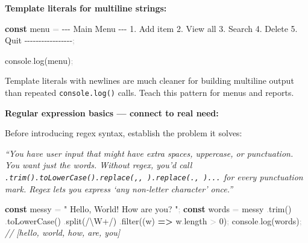 \documentclass[
  justified,
  openright,
]{tufte-book}
\newcommand{\KeywordTok}[1]{\textcolor{CodeKeyword}{\textbf{#1}}}  %
\newcommand{\StringTok}[1]{\textcolor{CodeString}{#1}}              %
\newcommand{\CommentTok}[1]{\textcolor{CodeComment}{\textit{#1}}}  %
\newcommand{\CodeNumTok}[1]{\textcolor{CodeNumber}{#1}}             %
\newcommand{\CodeFuncTok}[1]{\textcolor{CodeKeyword}{#1}}           %
\newcommand{\CodeTypeTok}[1]{\textcolor{CodeType}{#1}}              %
\newcommand{\OperatorTok}[1]{\textcolor{DarkGray}{#1}}              %
\newenvironment{Shaded}{%
  \begin{mdframed}[style=TufteCode]%
}{%
  \end{mdframed}%
}
\begin{document}
\textbf{Template literals for multiline strings:}

\begin{Shaded}
\begin{Highlighting}[]
\KeywordTok{const} menu \OperatorTok{=} \StringTok{\textasciigrave{}}
\StringTok{{-}{-}{-} Main Menu {-}{-}{-}}
\StringTok{1. Add item}
\StringTok{2. View all}
\StringTok{3. Search}
\StringTok{4. Delete}
\StringTok{5. Quit}
\StringTok{{-}{-}{-}{-}{-}{-}{-}{-}{-}{-}{-}{-}{-}{-}{-}{-}{-}\textasciigrave{}}\OperatorTok{;}
 
console\OperatorTok{.}\CodeFuncTok{log}(menu)\OperatorTok{;}
\end{Highlighting}
\end{Shaded}

Template literals with newlines are much cleaner for building multiline
output than repeated \texttt{console.log()} calls. Teach this pattern
for menus and reports.

\textbf{Regular expression basics --- connect to real need:}

Before introducing regex syntax, establish the problem it solves:

\emph{``You have user input that might have extra spaces, uppercase, or
punctuation. You want just the words. Without regex, you'd call
\texttt{.trim().toLowerCase().replace(\textquotesingle{},\textquotesingle{},\ \textquotesingle{}\textquotesingle{}).replace(\textquotesingle{}.\textquotesingle{},\ \textquotesingle{}\textquotesingle{})...}
for every punctuation mark. Regex lets you express `any non-letter
character' once.''}

\begin{Shaded}
\begin{Highlighting}[]
\KeywordTok{const} messy \OperatorTok{=} \StringTok{"  Hello, World!   How are you?  "}\OperatorTok{;}
\KeywordTok{const} words \OperatorTok{=} messy
  \OperatorTok{.}\CodeFuncTok{trim}()
  \OperatorTok{.}\CodeFuncTok{toLowerCase}()
  \OperatorTok{.}\CodeFuncTok{split}(\StringTok{/}\StringTok{\textbackslash{}W+}\StringTok{/})
  \OperatorTok{.}\CodeFuncTok{filter}((w) \KeywordTok{=\textgreater{}} w\OperatorTok{.}\CodeTypeTok{length} \OperatorTok{\textgreater{}} \CodeNumTok{0})\OperatorTok{;}
console\OperatorTok{.}\CodeFuncTok{log}(words)\OperatorTok{;} \CommentTok{// [\textquotesingle{}hello\textquotesingle{}, \textquotesingle{}world\textquotesingle{}, \textquotesingle{}how\textquotesingle{}, \textquotesingle{}are\textquotesingle{}, \textquotesingle{}you\textquotesingle{}]}
\end{Highlighting}
\end{Shaded}
\end{document}
